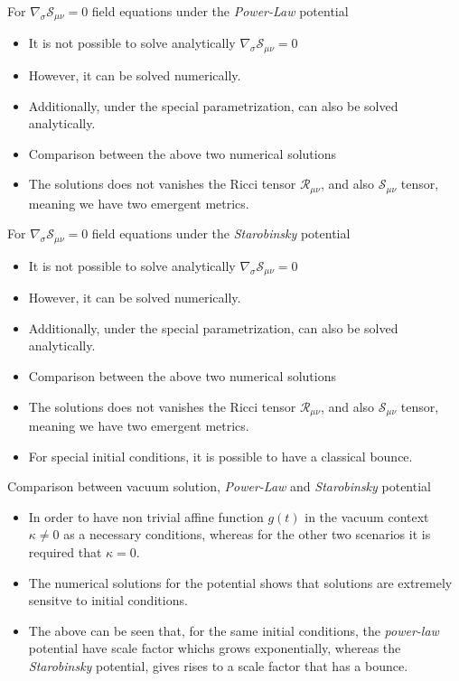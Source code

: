 \documentclass[10pt,a4paper]{article}
\begin{document}
For $\nabla_\sigma \mathcal{S}_{\mu\nu} = 0$ field equations under the \textit{Power-Law} potential
\begin{itemize}
  \item It is not possible to solve analytically $\nabla_\sigma \mathcal{S}_{\mu\nu} = 0$
  \item However, it can be solved numerically.
  \item Additionally, under the special parametrization, can also be solved analytically.
  \item Comparison between the above two numerical solutions
  \item The solutions does not vanishes the Ricci tensor $\mathcal{R}_{\mu\nu}$, and also $\mathcal{S}_{\mu\nu}$ tensor, meaning we have two emergent metrics.
\end{itemize}

For $\nabla_\sigma \mathcal{S}_{\mu\nu} = 0$ field equations under the \textit{Starobinsky} potential
\begin{itemize}
  \item It is not possible to solve analytically $\nabla_\sigma \mathcal{S}_{\mu\nu} = 0$
  \item However, it can be solved numerically.
  \item Additionally, under the special parametrization, can also be solved analytically.
  \item Comparison between the above two numerical solutions
  \item The solutions does not vanishes the Ricci tensor $\mathcal{R}_{\mu\nu}$, and also $\mathcal{S}_{\mu\nu}$ tensor, meaning we have two emergent metrics.
  \item For special initial conditions, it is possible to have a classical bounce.
\end{itemize}

Comparison between vacuum solution, \textit{Power-Law} and \textit{Starobinsky} potential
\begin{itemize}
  \item In order to have non trivial affine function $g(t)$ in the vacuum context $\kappa \neq 0$ as a necessary conditions, whereas for the other two scenarios it is required that $\kappa = 0$.
  \item The numerical solutions for the potential shows that solutions are extremely sensitve to initial conditions.
  \item The above can be seen that, for the same initial conditions, the \textit{power-law} potential have scale factor whichs grows exponentially, whereas 
        the \textit{Starobinsky} potential, gives rises to a scale factor that has a bounce.
\end{itemize}
\end{document}
